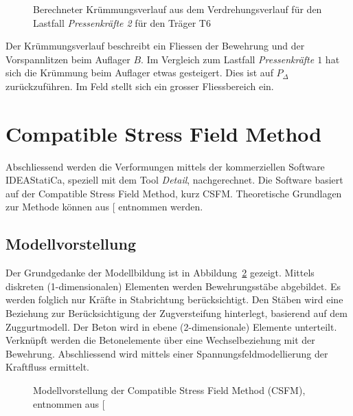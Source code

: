 \documentclass[
  11pt,
  letterpaper,
]{scrreprt}
\begin{document}
\begin{figure}[H]


\caption{\label{fig-chi-max-t6l12}Berechneter Krümmungsverlauf aus dem
Verdrehungsverlauf für den Lastfall \emph{Pressenkräfte 2} für den
Träger T6}

\end{figure}%

Der Krümmungsverlauf beschreibt ein Fliessen der Bewehrung und der
Vorspannlitzen beim Auflager \(B\). Im Vergleich zum Lastfall
\emph{Pressenkräfte \(1\)} hat sich die Krümmung beim Auflager etwas
gesteigert. Dies ist auf \(P_\Delta\) zurückzuführen. Im Feld stellt
sich ein grosser Fliessbereich ein.

\section{Compatible Stress Field
Method}\label{compatible-stress-field-method}

Abschliessend werden die Verformungen mittels der kommerziellen Software
IDEAStatiCa, speziell mit dem Tool \emph{Detail}, nachgerechnet. Die
Software basiert auf der Compatible Stress Field Method, kurz CSFM.
Theoretische Grundlagen zur Methode können aus
{[}\citeproc{ref-kaufmann_compatible_2020}{7}{]} entnommen werden.

\subsection{Modellvorstellung}\label{modellvorstellung-1}

Der Grundgedanke der Modellbildung ist in Abbildung~\ref{fig-csfm_base}
gezeigt. Mittels diskreten (1-dimensionalen) Elementen werden
Bewehrungsstäbe abgebildet. Es werden folglich nur Kräfte in
Stabrichtung berücksichtigt. Den Stäben wird eine Beziehung zur
Berücksichtigung der Zugversteifung hinterlegt, basierend auf dem
Zuggurtmodell. Der Beton wird in ebene (2-dimensionale) Elemente
unterteilt. Verknüpft werden die Betonelemente über eine
Wechselbeziehung mit der Bewehrung. Abschliessend wird mittels einer
Spannungsfeldmodellierung der Kraftfluss ermittelt.

\begin{figure}[H]


\caption{\label{fig-csfm_base}Modellvorstellung der Compatible Stress
Field Method (CSFM), entnommen aus
{[}\citeproc{ref-kaufmann_compatible_2020}{7}{]}}

\end{figure}%
\end{document}
